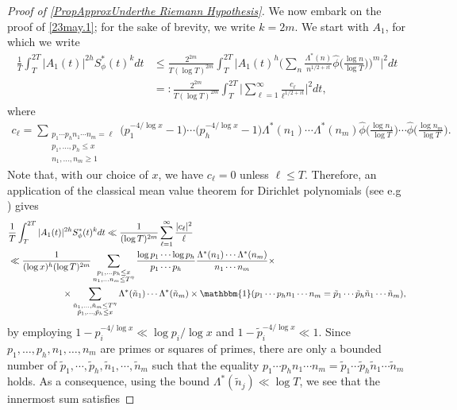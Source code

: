 \documentclass[12pt,oneside,english,a4paper]{amsart}
\theoremstyle{remark}
\numberwithin{equation}{section}
\newcommand{\Starphi}{S_\phi^*}
\begin{document}
\begin{proof}[Proof of \cref{PropApproxUnderthe Riemann Hypothesis}]
    We now embark on the proof of \eqref{23may.1}; for the sake of brevity, we write $k=2m$. We start with $A_1$, for which we write
    \begin{align*}
        \frac{1}{T}\int_T^{2T} |A_1(t)|^{2h} \Starphi(t)^{k}  dt
        &\leq \frac{2^{2m}}{T(\log T)^{2m}}\int_T^{2T} \bigg | A_1(t)^h \bigg( \sum_{n} \frac{\Lambda^*(n)}{n^{1/2+it}} \hat\phi \bigg( \frac{\log n}{\log T} \bigg) \bigg)^m \bigg|^2 dt\\
        &=: \frac{2^{2m}}{T(\log T)^{2m}}\int_T^{2T} \bigg| \sum_{\ell=1}^{\infty}\frac{c_\ell}{\ell^{1/2+it}} \bigg|^{2} dt,
    \end{align*}
    where
    \begin{align*}
        c_{\ell}=\sum_{\substack{p_1\cdots p_h n_1\cdots n_m=\ell \\ p_1, \dots, p_h\leq x\\n_1, \dots, n_m \ge 1 }}\Big(p_1^{-4/\log x}-1 \Big) \cdots \Big(p_h^{-4/\log x}-1 \Big)
    \Lambda^*(n_1) \cdots \Lambda^*(n_m) \hat\phi\bigg(\frac{\log n_1}{\log T}\bigg) \cdots \hat\phi\bigg(\frac{\log n_m}{\log T}\bigg).
    \end{align*}
    Note that, with our choice of $x$, we have $c_\ell=0$ unless $\ell\leq T$. Therefore, an application of the classical mean value theorem for Dirichlet polynomials (see e.g \cite[Chapter 9]{IKowalski}) gives
    \begin{align}
        &\notag\frac{1}{T}\int_T^{2T} |A_1(t)|^{2h} \Starphi(t)^{k}  dt
        \ll \frac{1}{(\log T)^{2m}}  \sum_{\ell=1}^\infty \frac{|c_\ell|^2}{\ell}\\
        &\notag 
        \ll \frac{1}{(\log x)^{h} (\log T)^{2 m}}  \sum_{\substack{p_1,\dots p_h\leq x \\ n_1,\dots n_m \leq T^\eta}} \frac{\log p_1 \cdots \log p_h}{p_1\cdots p_h} 
        \frac{\Lambda^*(n_1) \cdots \Lambda^*(n_m)}{n_1\cdots n_m}  \times \\ &\notag \qquad \qquad \qquad \times \sum_{\substack{ \tilde n_1,\dots,\tilde n_m \leq T^\eta \\ \tilde p_1,\dots,\tilde p_h \leq x}} \Lambda^*(\tilde n_1) \cdots \Lambda^*(\tilde n_m) \times \mathbbm{1}(p_1\cdots p_hn_1\cdots n_m = \tilde p_1\cdots \tilde p_h \tilde n_1\cdots \tilde n_m),
    \end{align}
    by employing $1-p_i^{-4/\log x} \ll \log p_i/\log x$ and $1-\tilde p_i^{-4/\log x} \ll1$. Since $p_1,\dots,p_h,n_1,\dots,n_m$ are primes or squares of primes,  there are only a bounded number of $\tilde p_1,\cdots, \tilde p_h, \tilde n_1,\cdots, \tilde n_m$ such that the equality $p_1\cdots p_hn_1\cdots n_m = \tilde p_1\cdots \tilde p_h \tilde n_1\cdots \tilde n_m$ holds. As a consequence, using the bound $\Lambda^*(\tilde n_j) \ll \log T$, we see that the innermost sum satisfies

\end{proof}
\end{document}
